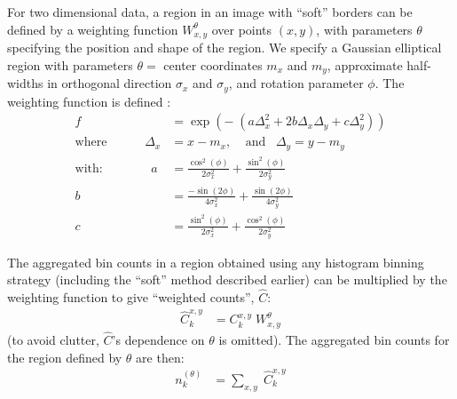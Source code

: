 \documentclass[
    ,final            %
  ]
  {aipproc}
\begin{document}
For two dimensional data, a region in an image with ``soft'' borders can be defined by a weighting function $W^{\theta}_{x,y}$ over points $(x,y)$, with
parameters $\theta$ specifying the position and shape of the region.
We specify a Gaussian elliptical region with parameters $\theta =$ center coordinates $m_x$ and $m_y$, approximate half-widths in orthogonal direction $\sigma_x$ and
$\sigma_y$, and rotation parameter $\phi$. 
The weighting function is defined \cite{rencher2003methods}:
\begin{align}
f &= \exp\left(- \;\left(a\Delta_x^2+2b\Delta_x\Delta_y+c\Delta_y^2 \right) \right)\label{eq:region-weight-in-2d-simpl} \\
\text{where} \;\;\;\;\;\;\;\;\;\;\;
\Delta_x &= x-m_x, \;\;\;\;\text{and} \;\;\; \Delta_y = y-m_y  \label{eq:Delta-defn}  \\
\text{with:} \;\;\;\;\;\;\;\;\;\;\;\;\;\;
a &= \frac{\cos^2(\phi)}{2\sigma_x^2} + \frac{\sin^2(\phi)}{2\sigma_y^2} \label{eq:a-wgt} \\
b &= \frac{-\sin(2\phi)}{4\sigma_x^2} + \frac{\sin(2\phi)}{4\sigma_y^2} \label{eq:b-wgt} \\
c &= \frac{\sin^2(\phi)}{2\sigma_x^2} + \frac{\cos^2(\phi)}{2\sigma_y^2} \label{eq:c-wgt}
\end{align}

The aggregated bin counts in a region obtained using any histogram binning strategy (including the ``soft'' method described earlier) can be multiplied by the weighting function to give ``weighted counts'', $\hat{C}$:
\begin{align}
\hat{C}^{x,y}_k &= C^{x,y}_k  \; W^{\theta}_{x,y}
\end{align}
(to avoid clutter, $\hat{C}$'s dependence on $\theta$ is omitted). The aggregated bin counts for the region defined by $\theta$ are then:
\begin{align}
n_k^{(\theta)} 
&= \sum_{x,y} \; \hat{C}^{x,y}_k  \label{eq:soft-bin-counts-2d} 
\end{align}


\end{document}
